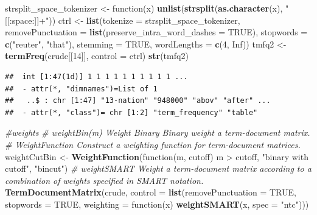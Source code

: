 \documentclass[]{book}
\newenvironment{Shaded}{\begin{snugshade}}{\end{snugshade}}
\newcommand{\KeywordTok}[1]{\textcolor[rgb]{0.13,0.29,0.53}{\textbf{{#1}}}}
\newcommand{\DataTypeTok}[1]{\textcolor[rgb]{0.13,0.29,0.53}{{#1}}}
\newcommand{\DecValTok}[1]{\textcolor[rgb]{0.00,0.00,0.81}{{#1}}}
\newcommand{\StringTok}[1]{\textcolor[rgb]{0.31,0.60,0.02}{{#1}}}
\newcommand{\CommentTok}[1]{\textcolor[rgb]{0.56,0.35,0.01}{\textit{{#1}}}}
\newcommand{\OtherTok}[1]{\textcolor[rgb]{0.56,0.35,0.01}{{#1}}}
\newcommand{\NormalTok}[1]{{#1}}
\begin{document}
\begin{Shaded}
\begin{Highlighting}[]
\NormalTok{strsplit_space_tokenizer <-}\StringTok{ }\NormalTok{function(x) }\KeywordTok{unlist}\NormalTok{(}\KeywordTok{strsplit}\NormalTok{(}\KeywordTok{as.character}\NormalTok{(x), }\StringTok{"[[:space:]]+"}\NormalTok{))}
\NormalTok{ctrl <-}\StringTok{ }\KeywordTok{list}\NormalTok{(}\DataTypeTok{tokenize =} \NormalTok{strsplit_space_tokenizer, }\DataTypeTok{removePunctuation =} \KeywordTok{list}\NormalTok{(}\DataTypeTok{preserve_intra_word_dashes =} \OtherTok{TRUE}\NormalTok{),}
             \DataTypeTok{stopwords =} \KeywordTok{c}\NormalTok{(}\StringTok{"reuter"}\NormalTok{, }\StringTok{"that"}\NormalTok{),}
             \DataTypeTok{stemming =} \OtherTok{TRUE}\NormalTok{,}
             \DataTypeTok{wordLengths =} \KeywordTok{c}\NormalTok{(}\DecValTok{4}\NormalTok{, }\OtherTok{Inf}\NormalTok{))}
\NormalTok{tmfq2 <-}\StringTok{ }\KeywordTok{termFreq}\NormalTok{(crude[[}\DecValTok{14}\NormalTok{]], }\DataTypeTok{control =} \NormalTok{ctrl)}
\KeywordTok{str}\NormalTok{(tmfq2)}
\end{Highlighting}
\end{Shaded}

\begin{verbatim}
##  int [1:47(1d)] 1 1 1 1 1 1 1 1 1 1 ...
##  - attr(*, "dimnames")=List of 1
##   ..$ : chr [1:47] "13-nation" "948000" "abov" "after" ...
##  - attr(*, "class")= chr [1:2] "term_frequency" "table"
\end{verbatim}

\begin{Shaded}
\begin{Highlighting}[]
\CommentTok{#weights}
\CommentTok{# weightBin(m) Weight Binary Binary weight a term-document matrix.}
\CommentTok{# WeightFunction Construct a weighting function for term-document matrices.}
\NormalTok{weightCutBin <-}\StringTok{ }\KeywordTok{WeightFunction}\NormalTok{(function(m, cutoff) m >}\StringTok{ }\NormalTok{cutoff,}
                               \StringTok{"binary with cutoff"}\NormalTok{, }\StringTok{"bincut"}\NormalTok{)}
\CommentTok{# weightSMART Weight a term-document matrix according to a combination of weights specified in SMART notation.}
\KeywordTok{TermDocumentMatrix}\NormalTok{(crude, }
                   \DataTypeTok{control =} \KeywordTok{list}\NormalTok{(}\DataTypeTok{removePunctuation =} \OtherTok{TRUE}\NormalTok{,}
                                  \DataTypeTok{stopwords =} \OtherTok{TRUE}\NormalTok{,}
                                  \DataTypeTok{weighting =} \NormalTok{function(x) }\KeywordTok{weightSMART}\NormalTok{(x, }\DataTypeTok{spec =} \StringTok{"ntc"}\NormalTok{)))}
\end{Highlighting}
\end{Shaded}
\end{document}
